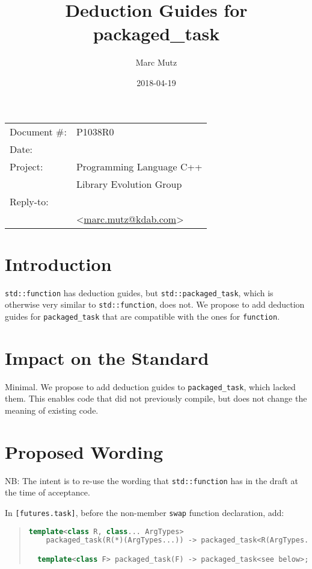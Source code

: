 \documentclass[11pt]{article}
\date{}
\title{Deduction Guides for packaged\_task}
\makeatletter
\newcommand{\emailaddress}{marc.mutz@kdab.com}
\newcommand{\email}{\href{mailto:\emailaddress}{\emailaddress}}
\makeatother
\begin{document}
\maketitle\vspace{-2cm}

\begin{flushright}
  \begin{tabular}{ll}
  Document \#:&P1038R0\\
  Date:       &\date{2018-04-19}\\
  Project:    &Programming Language C++\\
              &Library Evolution Group\\
  Reply-to:   &\author{Marc Mutz}\\
              &\textless\email\textgreater
  \end{tabular}
\end{flushright}

\section{Introduction}

\texttt{std::function} has deduction guides, but
\texttt{std::packaged\_task}, which is otherwise very similar to
\texttt{std::function}, does not. We propose to add deduction guides
for \texttt{packaged\_task} that are compatible with the ones for
\texttt{function}.

\section{Impact on the Standard}

Minimal. We propose to add deduction guides to
\texttt{packaged\_task}, which lacked them. This enables code that did
not previously compile, but does not change the meaning of existing code.

\section{Proposed Wording}

NB: The intent is to re-use the wording that \texttt{std::function} has in
the draft at the time of acceptance.

In \texttt{[futures.task]}, before the non-member
\texttt{swap} function declaration, add:

\begin{quote}
\begin{lstlisting}[language=C++]
  template<class R, class... ArgTypes>
    packaged_task(R(*)(ArgTypes...)) -> packaged_task<R(ArgTypes...)>;

  template<class F> packaged_task(F) -> packaged_task<see below>;
\end{lstlisting}
\end{quote}
\end{document}
